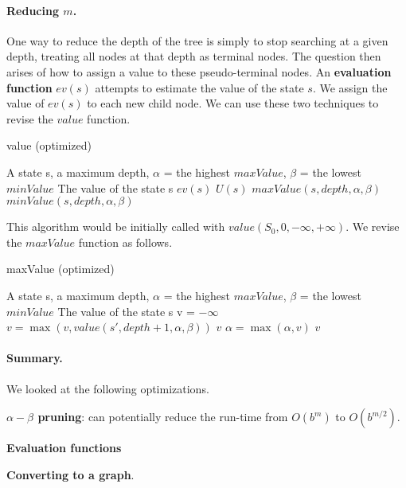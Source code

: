\documentclass[10pt,a4paper]{article}
\newenvironment{itemize_packed}{
\begin{itemize}
\setlength{\itemsep}{0pt}
\setlength{\parskip}{0pt}
}{\end{itemize}}
\begin{document}
\paragraph{Reducing $m$.} One way to reduce the depth of the tree is simply to stop searching at a given depth, treating all nodes at that depth as terminal nodes. The question then arises of how to assign a value to these pseudo-terminal nodes. An \textbf{evaluation function} $ev(s)$ attempts to estimate the value of the state $s$. We assign the value of $ev(s)$ to each new child node.
\newline
\newline
We can use these two techniques to revise the $value$ function.
\begin{algorithm}
\caption{value (optimized)}
\begin{algorithmic}[1]
\REQUIRE A state s, a maximum depth, $\alpha$ = the highest $maxValue$, $\beta$ = the lowest $minValue$
\ENSURE The value of the state s
	\RETURN $ev(s)$
\ENDIF
{}
	\RETURN $U(s)$
\ENDIF
{}
	\RETURN $maxValue(s, depth, \alpha, \beta)$
\ENDIF
{}
	\RETURN $minValue(s, depth, \alpha, \beta)$
\ENDIF
\end{algorithmic}
\end{algorithm}

\noindent This algorithm would be initially called with $value(S_0, 0, -\infty, +\infty)$. We revise the $maxValue$ function as follows.
\begin{algorithm}
\caption{maxValue (optimized)}
\begin{algorithmic}[1]
\REQUIRE A state s, a maximum depth, $\alpha$ = the highest $maxValue$, $\beta$ = the lowest $minValue$
\ENSURE The value of the state s
\STATE v = $-\infty$
	\STATE $v = \max(v, value(s', depth+1, \alpha, \beta))$
		\RETURN $v$
	\ENDIF
	\STATE $\alpha = \max(\alpha, v)$
\ENDFOR
\RETURN $v$
\end{algorithmic}
\end{algorithm}

\paragraph{Summary.} We looked at the following optimizations.
\begin{itemize_packed}
\item \textbf{$\alpha-\beta$ pruning}: can potentially reduce the run-time from $O(b^m)$ to $O(b^{m/2})$.
\item \textbf{Evaluation functions}
\item \textbf{Converting to a graph}.
\end{itemize_packed}
\end{document}
